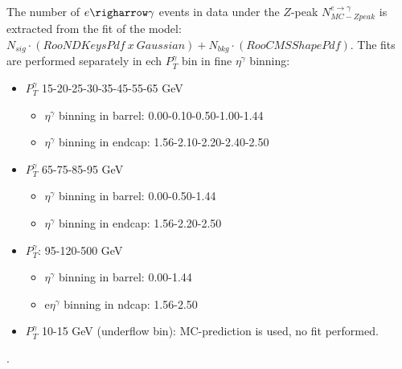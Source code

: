 The number of $e\righarrow\gamma$ events in data under the $Z$-peak $N_{MC-Zpeak}^{e\rightarrow\gamma}$ is extracted from the fit of the model: $N_{sig} \cdot (RooNDKeysPdf~x~Gaussian) +  N_{bkg} \cdot (RooCMSShapePdf)$. The fits are performed separately in ech $P_T^\gamma$ bin in fine $\eta^\gamma$ binning:
     \begin{itemize}
        \item $P_T^\gamma$ 15-20-25-30-35-45-55-65 GeV
           \begin{itemize}
              \item $\eta^\gamma$ binning in barrel: 0.00-0.10-0.50-1.00-1.44
              \item $\eta^\gamma$ binning in endcap: 1.56-2.10-2.20-2.40-2.50
           \end{itemize}
        \item $P_T^\gamma$ 65-75-85-95 GeV
          \begin{itemize}
              \item $\eta^\gamma$ binning in barrel: 0.00-0.50-1.44
              \item $\eta^\gamma$ binning in endcap: 1.56-2.20-2.50
           \end{itemize}
        \item $P_T^\gamma$: 95-120-500 GeV
          \begin{itemize}
              \item $\eta^\gamma$ binning in barrel: 0.00-1.44
              \item e$\eta^\gamma$ binning in ndcap: 1.56-2.50
           \end{itemize}
        \item $P_T^\gamma$ 10-15 GeV (underflow bin): MC-prediction is used, no fit performed.
     \end{itemize}
.








